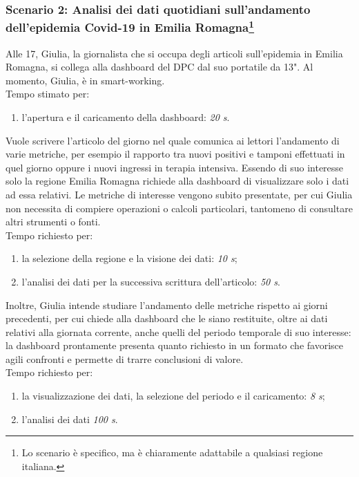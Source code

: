 \subsubsection[Scenario 2: Analisi dei dati quotidiani sull'andamento dell'epidemia Covid-19 in Emilia Romagna]{Scenario 2: Analisi dei dati quotidiani sull'andamento dell'epidemia Covid-19 in Emilia Romagna\footnote{Lo scenario è specifico, ma è chiaramente adattabile a qualsiasi regione italiana.}}
Alle 17, Giulia, la giornalista che si occupa degli articoli sull'epidemia in Emilia Romagna, si collega alla dashboard del DPC dal suo portatile da 13". Al momento, Giulia, è in smart-working.\\
Tempo stimato per:
\begin{enumerate}
    \item l'apertura e il caricamento della dashboard: \textit{20 s}.
\end{enumerate}

\noindent
Vuole scrivere l'articolo del giorno nel quale comunica ai lettori l'andamento di varie metriche, per esempio il rapporto tra nuovi positivi e tamponi effettuati in quel giorno oppure i nuovi ingressi in terapia intensiva. Essendo di suo interesse solo la regione Emilia Romagna richiede alla dashboard di visualizzare solo i dati ad essa relativi. Le metriche di interesse vengono subito presentate, per cui Giulia non necessita di compiere operazioni o calcoli particolari, tantomeno di consultare altri strumenti o fonti.\\
Tempo richiesto per:
\begin{enumerate}
    \item la selezione della regione e la visione dei dati: \textit{10 s};
    \item l'analisi dei dati per la successiva scrittura dell'articolo: \textit{50 s}.
\end{enumerate}

\noindent
Inoltre, Giulia intende studiare l'andamento delle metriche rispetto ai giorni precedenti, per cui chiede alla dashboard che le siano restituite, oltre ai dati relativi alla giornata corrente, anche quelli del periodo temporale di suo interesse: la dashboard prontamente presenta quanto richiesto in un formato che favorisce agili confronti e permette di trarre conclusioni di valore.\\
Tempo richiesto per:
\begin{enumerate}
    \item la visualizzazione dei dati, la selezione del periodo e il caricamento: \textit{8 s};
    \item l'analisi dei dati \textit{100 s}.
\end{enumerate}

